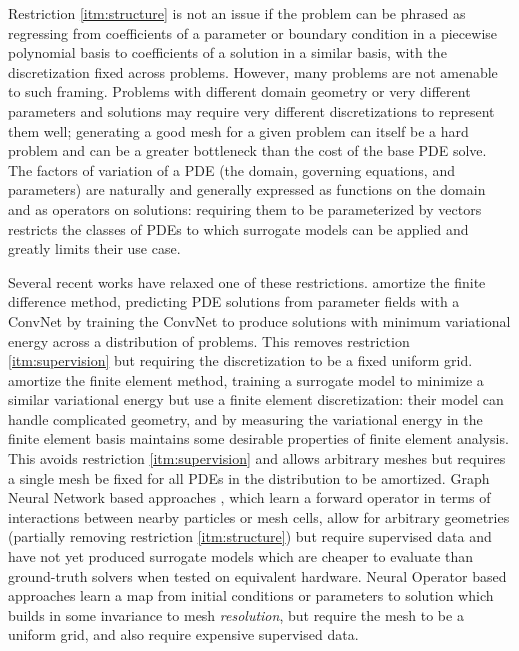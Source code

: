 Restriction \ref{itm:structure} is not an issue if the problem can be phrased as
regressing from coefficients of a parameter or boundary condition in a piecewise polynomial
basis to coefficients of a solution in a similar basis, with the discretization
fixed across problems.
However, many problems are not amenable to such framing.
Problems with different domain geometry or very different parameters and solutions
may require very different discretizations to represent them well;
generating a good mesh for a given problem can itself be a hard problem and can be a
greater bottleneck than the cost of the base PDE solve.
The factors of variation of a PDE (the domain, governing equations, and parameters)
are naturally and generally expressed as functions on the domain and as
operators on solutions: requiring them to be parameterized by vectors restricts
the classes of PDEs to which surrogate models can be applied and greatly limits their
use case.

Several recent works have relaxed one of these restrictions.
\citet{zhu2019physics} amortize the finite difference method,
predicting PDE solutions from parameter fields with a
ConvNet by training the ConvNet to produce solutions with minimum variational energy
across a distribution of problems.
This removes restriction \ref{itm:supervision} but requiring the discretization
to be a fixed uniform grid.
\citet{xue2020amortized} amortize the finite element method, training a surrogate model
to minimize a similar variational energy but use a finite element discretization:
their model can handle complicated geometry, and by measuring the variational energy
in the finite element basis maintains some desirable properties of finite element
analysis. This avoids restriction \ref{itm:supervision} and allows arbitrary
meshes but requires a single mesh be fixed for all PDEs in the distribution to be
amortized.
Graph Neural Network based approaches \citep{sanchez2020learning,pfaff2020learning},
which learn a forward operator in terms of
interactions between nearby particles or mesh cells,
allow for arbitrary geometries (partially removing restriction
\ref{itm:structure})
but require supervised data and have not yet produced surrogate models which are
cheaper to evaluate than ground-truth solvers when tested on equivalent hardware.
Neural Operator based approaches \citep{li2020neural,li2020fourier} learn a map from
initial conditions or parameters to solution which builds in
some invariance to mesh \emph{resolution}, but require the mesh to be a uniform
grid, and also require expensive supervised data.
